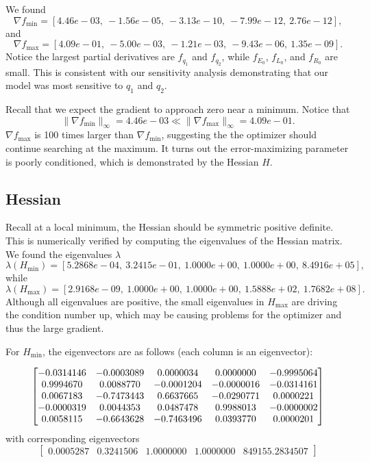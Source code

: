 \documentclass{article}
\begin{document}
We found
$$ \nabla f _{\text{min}} = [4.46e-03,~-1.56e-05,~-3.13e-10,~-7.99e-12,~2.76e-12 ] ,$$ 
and
$$ \nabla f _{\text{max}} = [4.09e-01,~-5.00e-03,~-1.21e-03,~-9.43e-06,~1.35e-09 ] .$$ 
Notice the largest partial derivatives are $f_{q_1}$ and $f_{q_2}$, while $f_{E_0}$, $f_{L_0}$, and $f_{R_0}$ are small.  This is consistent with our sensitivity analysis demonstrating that our model was most sensitive to $q_1$ and $q_2$.

Recall that we expect the gradient to approach zero near a minimum.  Notice that $$\| \nabla f_{\min} \|_\infty = 4.46 e-03 \ll \| \nabla f_{\max} \|_\infty = 4.09 e-01. $$  
$\nabla f_{\max}$ is 100 times larger than $ \nabla f_{\min} $, suggesting the the optimizer should continue searching at the maximum.  It turns out the error-maximizing parameter is poorly conditioned, which is demonstrated by the Hessian $H$.

\subsection{Hessian}

Recall at a local minimum, the Hessian should be symmetric positive definite.  This is numerically verified by computing the eigenvalues of the Hessian matrix.  We found the eigenvalues $\lambda$
$$ \lambda(H_{\min})  = [5.2868e-04,~ 3.2415e-01,~1.0000e+00,~1.0000e+00,~8.4916e+05],$$ 
while
$$ \lambda(H_{\max})  =   [ 2.9168e-09,~1.0000e+00,~1.0000e+00,~1.5888e+02,~1.7682e+08].$$
Although all eigenvalues are positive, the small eigenvalues in $H_{\max}$ are driving the condition number up, which may be causing problems for the optimizer and thus the large gradient.

For $H_{\min}$, the eigenvectors are as follows (each column is an eigenvector):

\[
  \begin{bmatrix}
	-0.0314146 & -0.0003089 &  0.0000034 &  0.0000000 & -0.9995064 \cr
	0.9994670 &  0.0088770 & -0.0001204 & -0.0000016 & -0.0314161 \cr
	0.0067183 & -0.7473443 &  0.6637665 & -0.0290771 &  0.0000221 \cr
	-0.0000319 &  0.0044353 &  0.0487478 &  0.9988013 & -0.0000002 \cr
	0.0058115 & -0.6643628 & -0.7463496 &  0.0393770 &  0.0000201
\end{bmatrix}
\]
with corresponding eigenvectors 
\[
  \begin{bmatrix}
	0.0005287 &  0.3241506 &  1.0000000 &  1.0000000 & 849155.2834507
\end{bmatrix}
\]
\end{document}
